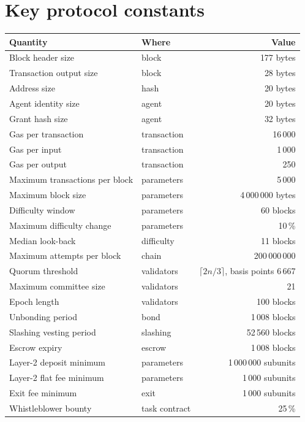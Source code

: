 \documentclass{article}
\begin{document}
\appendix

\section{Key protocol constants}
\label{app:constants}

\begin{table}[htbp]
\centering
\begin{tabular}{llr}
\toprule
\textbf{Quantity} & \textbf{Where} & \textbf{Value} \\
\midrule
Block header size & block & 177 bytes \\
Transaction output size & block & 28 bytes \\
Address size & hash & 20 bytes \\
Agent identity size & agent & 20 bytes \\
Grant hash size & agent & 32 bytes \\
Gas per transaction & transaction & 16\,000 \\
Gas per input & transaction & 1\,000 \\
Gas per output & transaction & 250 \\
Maximum transactions per block & parameters & 5\,000 \\
Maximum block size & parameters & 4\,000\,000 bytes \\
Difficulty window & parameters & 60 blocks \\
Maximum difficulty change & parameters & 10\,\% \\
Median look-back & difficulty & 11 blocks \\
Maximum attempts per block & chain & 200\,000\,000 \\
Quorum threshold & validators & $\lceil 2n/3 \rceil$, basis points 6\,667 \\
Maximum committee size & validators & 21 \\
Epoch length & validators & 100 blocks \\
Unbonding period & bond & 1\,008 blocks \\
Slashing vesting period & slashing & 52\,560 blocks \\
Escrow expiry & escrow & 1\,008 blocks \\
Layer-2 deposit minimum & parameters & 1\,000\,000 subunits \\
Layer-2 flat fee minimum & parameters & 1\,000 subunits \\
Exit fee minimum & exit & 1\,000 subunits \\
Whistleblower bounty & task contract & 25\,\% \\

\end{tabular}
\end{table}
\end{document}
